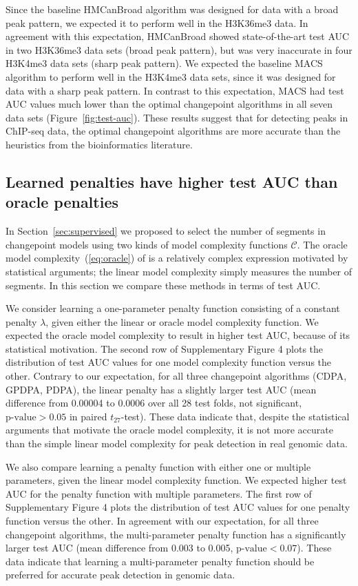 \documentclass[twoside,11pt]{article}
\begin{document}
Since the baseline HMCanBroad algorithm was designed for data with a
broad peak pattern, we expected it to perform well in the H3K36me3
data. In agreement with this expectation, HMCanBroad showed
state-of-the-art test AUC in two H3K36me3 data sets (broad peak
pattern), but was very inaccurate in four H3K4me3 data sets (sharp
peak pattern). We expected the baseline MACS algorithm to perform well
in the H3K4me3 data sets, since it was designed for data with a sharp
peak pattern. In contrast to this expectation, MACS had test AUC
values much lower than the optimal changepoint algorithms in all seven data
sets (Figure~\ref{fig:test-auc}). These results suggest that for
detecting peaks in ChIP-seq data, the optimal changepoint algorithms are more
accurate than the heuristics from the bioinformatics literature.

\subsection{Learned penalties have higher test AUC than oracle
  penalties}

In Section~\ref{sec:supervised} we proposed to select the number of
segments in changepoint models using two kinds of model complexity
functions $\mathcal C$. The oracle model complexity~(\ref{eq:oracle})
of \citet{cleynen2013segmentation} is a relatively complex expression
 motivated by statistical arguments; the linear model complexity
simply measures the number of segments. In this section we compare
these methods in terms of test AUC.

We consider learning a one-parameter penalty function consisting of a
constant penalty $\lambda$, given either the linear or oracle model
complexity function. We expected the oracle model complexity to result
in higher test AUC, because of its statistical motivation. The second
row of Supplementary Figure 4 plots the distribution of test AUC
values for one model complexity function versus the other. Contrary to
our expectation, for all three changepoint algorithms (CDPA, GPDPA,
PDPA), the linear penalty has a slightly larger test AUC (mean
difference from 0.00004 to 0.0006 over all 28 test folds, not significant,
$\text{p-value}>0.05$ in paired $t_{27}$-test). These data indicate
that, despite the statistical arguments that motivate the oracle model
complexity, it is not more accurate than the simple linear model
complexity for peak detection in real genomic data.

We also compare learning a penalty function with either one or
multiple parameters, given the linear model complexity function. We
expected higher test AUC for the penalty function with multiple
parameters. The first row of Supplementary Figure 4 plots the
distribution of test AUC values for one penalty function versus the
other. In agreement with our expectation, for all three changepoint
algorithms, the multi-parameter penalty function has a significantly
larger test AUC (mean difference from 0.003 to 0.005,
$\text{p-value}<0.07$). These data indicate that learning a
multi-parameter penalty function should be preferred for accurate peak
detection in genomic data.
\end{document}
